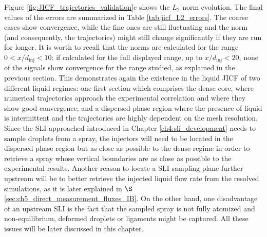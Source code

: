 Figure \ref{fig:JICF_trajectories_validation}c shows the $L_2$ norm evolution. The final values of the errors are summarized in Table \ref{tab:jicf_L2_errors}. The coarse cases show convergence, while the fine ones are still fluctuating and the norm (and consequently, the trajectories) might still change significantly if they are run for longer. It is worth to recall that the norms are calculated for the range $0 < x/d_\mathrm{inj} < 10$: if calculated for the full displayed range, up to $x/d_\mathrm{inj} < 20$, none of the signals show convergence for the range studied, as explained in the previous section. This demonstrates again the existence in the liquid JICF of two different liquid regimes: one first section which comprises the dense core, where numerical trajectories approach the experimental correlation and where they show good convergence; and a dispersed-phase region where the presence of liquid is intermittent and the trajectories are highly dependent on the mesh resolution. Since the SLI approached introduced in Chapter \ref{ch4:sli_development} needs to sample droplets from a spray, the injectors will need to be located in the dispersed phase region but as close as possible to the dense regime in order to retrieve a spray whose vertical boundaries are as close as possible to the experimental results. Another reason to locate a SLI sampling plane further upstream will be to better retrieve the injected liquid flow rate from the resolved simulations, as it is later explained in $\S$\ref{sec:ch5_direct_measurement_fluxes_IB}. On the other hand, one disadvantage of an upstream SLI is the fact that the sampled spray is not fully atomized and non-equilibrium, deformed droplets or ligaments might be captured. All these issues will be later discussed in this chapter.



\clearpage

